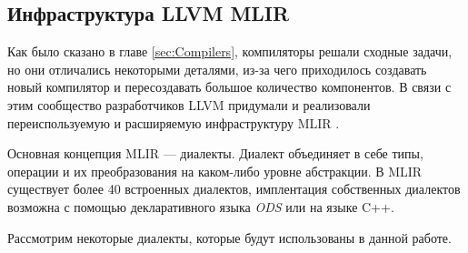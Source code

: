 \subsection{Инфраструктура LLVM MLIR}
\label{impl:mlir} %

Как было сказано в главе \ref{sec:Compilers}, компиляторы
решали сходные задачи, но они отличались некоторыми деталями, из-за чего
приходилось создавать новый компилятор и пересоздавать большое количество
компонентов. В связи с этим сообщество разработчиков LLVM придумали и реализовали
переиспользуемую и расширяемую инфраструктуру MLIR
\cite{mlir-doc, mlir-article1, mlir-article2, mlir-article3}.

Основная концепция MLIR --- диалекты. Диалект объединяет в себе типы, операции
и их преобразования на каком-либо уровне абстракции. В MLIR существует более 40
встроенных диалектов, имплентация собственных диалектов возможна с помощью
декларативного языка \textit{ODS} или на языке C++.

Рассмотрим некоторые диалекты, которые будут использованы в данной работе.

